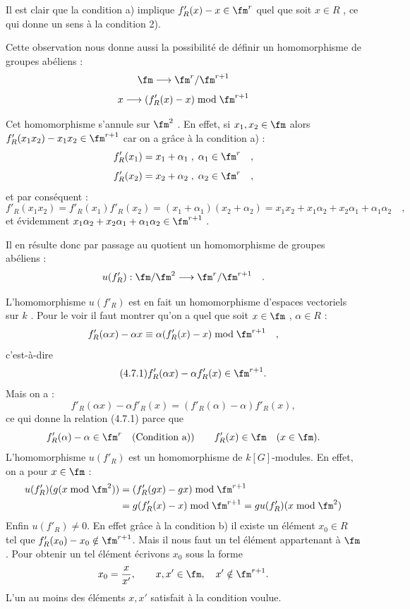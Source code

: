 Il est clair que la condition a) implique $f'_R(x) - x \in \fm^r$ quel que soit $x \in R$ , ce qui donne un sens à la condition 2).

Cette observation nous donne aussi la possibilité de définir un homomorphisme de groupes abéliens :
\[
\fm \longrightarrow \fm^r/\fm^{r+1}
\]
\[
x \longrightarrow (f'_R(x) - x) \bmod \fm^{r+1}
\]

Cet homomorphisme s'annule sur $\fm^2$ . En effet, si $x_1, x_2 \in \fm$ alors $f'_R(x_1x_2) - x_1x_2 \in \fm^{r+1}$ car on a grâce à la condition a) :
\[
f'_R(x_1) = x_1 + \alpha_1 \; , \; \alpha_1 \in \fm^r \quad ,
\]
\[
f'_R(x_2) = x_2 + \alpha_2 \; , \; \alpha_2 \in \fm^r \quad ,
\]
et par conséquent :
\[
f'_R(x_1x_2) = f'_R(x_1)f'_R(x_2) = (x_1 + \alpha_1)(x_2 + \alpha_2) = x_1x_2 + x_1\alpha_2 + x_2\alpha_1 + \alpha_1\alpha_2 \quad ,
\]
et évidemment $x_1\alpha_2 + x_2\alpha_1 + \alpha_1\alpha_2 \in \fm^{r+1}$ .

Il en résulte donc par passage au quotient un homomorphisme de groupes abéliens :
\[
u(f'_R) : \fm/\fm^2 \longrightarrow \fm^r/\fm^{r+1} \quad .
\]

L'homomorphisme $u(f'_R)$ est en fait un homomorphisme d'espaces vectoriels sur $k$ . Pour le voir il faut montrer qu'on a quel que soit $x \in \fm$ , $\alpha \in R$ :
\[
f'_R(\alpha x) - \alpha x \equiv \alpha(f'_R(x) - x) \bmod \fm^{r+1} \quad ,
\]
c'est-à-dire
\begin{equation}
\tag{4.7.1}
f'_R(\alpha x)-\alpha f'_R(x)\in\fm^{r+1}.
\end{equation}
Mais on a :
\[
f'_R(\alpha x)-\alpha f'_R(x)=(f'_R(\alpha)-\alpha)f'_R(x),
\]
ce qui donne la relation (4.7.1) parce que
\[
f'_R(\alpha)-\alpha\in\fm^r\quad\hbox{(Condition a))}
\qquad
f'_R(x)\in\fm\quad (x\in\fm).
\]
L'homomorphisme $u(f'_R)$ est un homomorphisme de $k[G]$-modules. En effet, on a pour $x\in\fm$ :
\[
\begin{aligned}
u(f'_R)(g(x\bmod\fm^2))
&=(f'_R(gx)-gx)\bmod\fm^{r+1}\\
&=g(f'_R(x)-x)\bmod\fm^{r+1}
=gu(f'_R)(x\bmod\fm^2)
\end{aligned}
\]
Enfin $u(f'_R)\ne0$. En effet grâce à la condition b) il existe un élément $x_0\in R$ tel que $f'_R(x_0)-x_0\notin\fm^{r+1}$. Mais il nous faut un tel élément appartenant à $\fm$. Pour obtenir un tel élément écrivons $x_0$ sous la forme
\[
x_0=\frac{x}{x'},\qquad x,x'\in\fm,\quad x'\notin\fm^{r+1}.
\]
L'un au moins des éléments $x,x'$ satisfait à la condition voulue.

